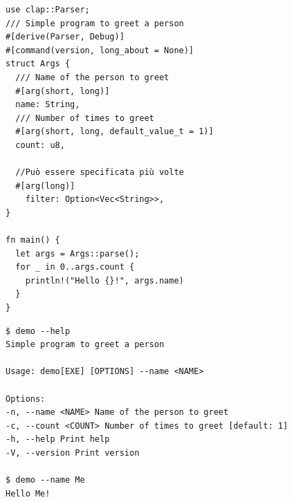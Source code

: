 \begin{center}
  \begin{minipage}{\linewidth}
    \begin{minipage}[t]{0.44\linewidth}

      \begin{verbatim}
use clap::Parser;
/// Simple program to greet a person
#[derive(Parser, Debug)]
#[command(version, long_about = None)]
struct Args {
  /// Name of the person to greet
  #[arg(short, long)]
  name: String,
  /// Number of times to greet
  #[arg(short, long, default_value_t = 1)]
  count: u8,

  //Può essere specificata più volte
  #[arg(long)]
    filter: Option<Vec<String>>, 
}

fn main() {
  let args = Args::parse();
  for _ in 0..args.count {
    println!("Hello {}!", args.name)
  }
}
\end{verbatim}

    \end{minipage}
    \hfill%
    \begin{minipage}[t]{0.54\linewidth}
      \begin{verbatim}
$ demo --help
Simple program to greet a person

Usage: demo[EXE] [OPTIONS] --name <NAME>

Options:
-n, --name <NAME> Name of the person to greet
-c, --count <COUNT> Number of times to greet [default: 1]
-h, --help Print help
-V, --version Print version

$ demo --name Me
Hello Me!
\end{verbatim}

    \end{minipage}
  \end{minipage}
\end{center}
